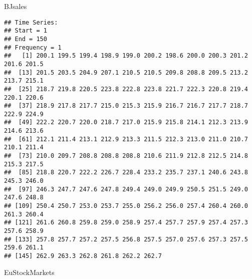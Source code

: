 \documentclass[
]{article}
\newenvironment{Shaded}{\begin{snugshade}}{\end{snugshade}}
\newcommand{\NormalTok}[1]{#1}
\begin{document}
\begin{Shaded}
\begin{Highlighting}[]
\NormalTok{BJsales}
\end{Highlighting}
\end{Shaded}

\begin{verbatim}
## Time Series:
## Start = 1 
## End = 150 
## Frequency = 1 
##   [1] 200.1 199.5 199.4 198.9 199.0 200.2 198.6 200.0 200.3 201.2 201.6 201.5
##  [13] 201.5 203.5 204.9 207.1 210.5 210.5 209.8 208.8 209.5 213.2 213.7 215.1
##  [25] 218.7 219.8 220.5 223.8 222.8 223.8 221.7 222.3 220.8 219.4 220.1 220.6
##  [37] 218.9 217.8 217.7 215.0 215.3 215.9 216.7 216.7 217.7 218.7 222.9 224.9
##  [49] 222.2 220.7 220.0 218.7 217.0 215.9 215.8 214.1 212.3 213.9 214.6 213.6
##  [61] 212.1 211.4 213.1 212.9 213.3 211.5 212.3 213.0 211.0 210.7 210.1 211.4
##  [73] 210.0 209.7 208.8 208.8 208.8 210.6 211.9 212.8 212.5 214.8 215.3 217.5
##  [85] 218.8 220.7 222.2 226.7 228.4 233.2 235.7 237.1 240.6 243.8 245.3 246.0
##  [97] 246.3 247.7 247.6 247.8 249.4 249.0 249.9 250.5 251.5 249.0 247.6 248.8
## [109] 250.4 250.7 253.0 253.7 255.0 256.2 256.0 257.4 260.4 260.0 261.3 260.4
## [121] 261.6 260.8 259.8 259.0 258.9 257.4 257.7 257.9 257.4 257.3 257.6 258.9
## [133] 257.8 257.7 257.2 257.5 256.8 257.5 257.0 257.6 257.3 257.5 259.6 261.1
## [145] 262.9 263.3 262.8 261.8 262.2 262.7
\end{verbatim}

\begin{Shaded}
\begin{Highlighting}[]
\NormalTok{EuStockMarkets}
\end{Highlighting}
\end{Shaded}
\end{document}
